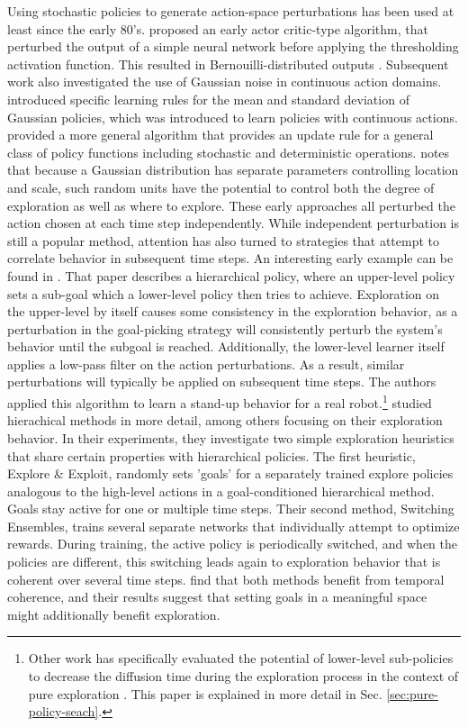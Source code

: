 \label{ssec:actionspace}
Using stochastic policies to generate action-space perturbations has been used at least since the early 80's.   proposed an early actor critic-type algorithm, that perturbed the output of a simple neural network before applying the thresholding activation function. This resulted in Bernouilli-distributed outputs . 
Subsequent work also investigated the use of Gaussian noise in continuous action domains.  introduced specific learning rules for the mean and standard deviation of Gaussian policies, which was introduced to learn policies with continuous actions.   provided a more general algorithm that provides an update rule for a general class of policy functions including stochastic and deterministic operations.  notes that because a Gaussian distribution has separate parameters controlling location and scale, such random units have the potential to control both the degree of exploration as well as where to explore.  These early approaches all perturbed the action chosen at each time step independently.
While independent perturbation is still a popular method, attention has also turned to strategies that attempt to correlate behavior in subsequent time steps. An interesting early example can be found in . That paper describes a hierarchical policy, where an upper-level policy sets a sub-goal which a lower-level policy then tries to achieve. Exploration on the upper-level by itself causes some consistency in the exploration behavior, as a perturbation in the goal-picking strategy will consistently perturb the system's behavior until the subgoal is reached. Additionally, the lower-level learner itself applies a low-pass filter on the action perturbations. As a result, similar perturbations will typically be applied on subsequent time steps. The authors applied this algorithm to learn a stand-up behavior for a real robot.\footnote{Other work has specifically evaluated the potential of lower-level sub-policies to decrease the diffusion time during the exploration process in the context of pure exploration . This paper is explained in more detail in Sec. \ref{sec:pure-policy-seach}.
}
 studied hierachical methods in more detail, among others focusing on their exploration behavior. In their experiments, they investigate two simple exploration heuristics that share certain properties with hierarchical policies. The first heuristic, Explore \& Exploit, randomly sets 'goals' for a separately trained explore policies analogous to the high-level actions in a goal-conditioned hierarchical method. Goals stay active for one or multiple time steps. Their second method, Switching Ensembles, trains several separate networks that individually attempt to optimize rewards. During training, the active policy is periodically switched, and when the policies are different, this switching leads again to exploration behavior that is coherent over several time steps. \citeauthor{nachum2019does} find that both methods benefit from temporal coherence, and their results suggest that setting goals in a meaningful space might additionally benefit exploration. 
